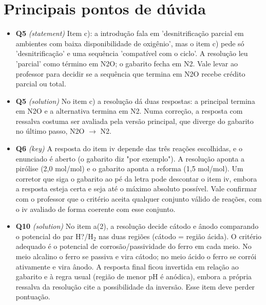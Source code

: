 \documentclass{article}%
\begin{document}
\section*{Principais pontos de dúvida}%
\begin{itemize}%
\item%
\textbf{Q5} \textit{(statement)} Item c): a introdução fala em 'desnitrificação parcial em ambientes com baixa disponibilidade de oxigênio', mas o item c) pede só 'desnitrificação' e uma sequência 'compatível com o ciclo'. A resolução leu 'parcial' como término em N2O; o gabarito fecha em N2. Vale levar ao professor para decidir se a sequência que termina em N2O recebe crédito parcial ou total.%
\item%
\textbf{Q5} \textit{(solution)} No item c) a resolução dá duas respostas: a principal termina em N2O e a alternativa termina em N2. Numa correção, a resposta com ressalva costuma ser avaliada pela versão principal, que diverge do gabarito no último passo, N2O $\to$ N2.%
\item%
\textbf{Q6} \textit{(key)} A resposta do item iv depende das três reações escolhidas, e o enunciado é aberto (o gabarito diz "por exemplo"). A resolução aponta a pirólise (2,0 mol/mol) e o gabarito aponta a reforma (1,5 mol/mol). Um corretor que siga o gabarito ao pé da letra pode descontar o item iv, embora a resposta esteja certa e seja até o máximo absoluto possível. Vale confirmar com o professor que o critério aceita qualquer conjunto válido de reações, com o iv avaliado de forma coerente com esse conjunto.%
\item%
\textbf{Q10} \textit{(solution)} No item a(2), a resolução decide cátodo e ânodo comparando o potencial do par H?/H$_{2}$ nas duas regiões (cátodo = região ácida). O critério adequado é o potencial de corrosão/passividade do ferro em cada meio. No meio alcalino o ferro se passiva e vira cátodo; no meio ácido o ferro se corrói ativamente e vira ânodo. A resposta final ficou invertida em relação ao gabarito e à regra usual (região de menor pH é anódica), embora a própria ressalva da resolução cite a possibilidade da inversão. Esse item deve perder pontuação.%
\end{itemize}%
\end{document}
